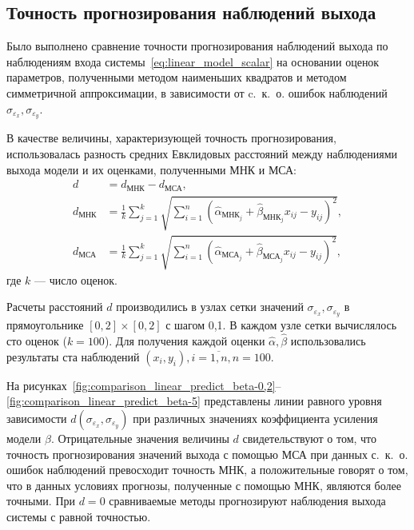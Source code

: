 \vspace{2\baselineskip}
\subsection{Точность прогнозирования наблюдений выхода}

Было выполнено сравнение точности прогнозирования наблюдений выхода по
наблюдениям входа системы~\eqref{eq:linear_model_scalar} на основании оценок параметров,
полученными методом наименьших квадратов и методом симметричной аппроксимации,
в зависимости от c.~к.~о. ошибок наблюдений \( \sigma_{\varepsilon_x}, \sigma_{\varepsilon_y} \).

В качестве величины, характеризующей точность прогнозирования,
использовалась разность средних Евклидовых расстояний между наблюдениями выхода модели и
их оценками, полученными МНК и МСА:
\begin{equation*}
  \begin{aligned}
    d &= d_{\text{МНК}} - d_{\text{МСА}}, \\
    d_{\text{МНК}} &= \frac{1}{k} \sum_{j=1}^k \sqrt{ \sum_{i=1}^n (\hat{\alpha}_{\text{МНК}_j} + \hat{\beta}_{\text{МНК}_j} x_{ij} - y_{ij})^2}, \\
    d_{\text{МСА}} &= \frac{1}{k} \sum_{j=1}^k \sqrt{ \sum_{i=1}^n (\hat{\alpha}_{\text{МСА}_j} + \hat{\beta}_{\text{МСА}_j} x_{ij} - y_{ij})^2},
    \end{aligned}
  \end{equation*}
где \( k \) --- число оценок.

Расчеты расстояний \( d \) производились в узлах сетки значений
\( \sigma_{\varepsilon_x}, \sigma_{\varepsilon_y} \) в прямоугольнике
\( [0, 2] \times [0, 2] \) с шагом 0{,}1.
В каждом узле сетки вычислялось сто оценок (\( k = 100 \)).
Для получения каждой оценки \( \hat{\alpha}, \hat{\beta} \) использовались результаты
ста наблюдений \( ( x_i, y_i ), i = \overline{1, n}, n = 100 \).

На рисунках~\ref{fig:comparison_linear_predict_beta-0,2}--\ref{fig:comparison_linear_predict_beta-5}
представлены линии равного уровня зависимости \( d(\sigma_{\varepsilon_x}, \sigma_{\varepsilon_y}) \)
при различных значениях коэффициента усиления модели \( \beta \).
Отрицательные значения величины \( d \) свидетельствуют о том,
что точность прогнозирования значений выхода с помощью МСА при данных с.~к.~о.
ошибок наблюдений превосходит точность МНК,
а положительные говорят о том, что в данных условиях прогнозы, полученные с помощью МНК,
являются более точными.
При \( d = 0 \) сравниваемые методы прогнозируют наблюдения выхода системы с
равной точностью.

